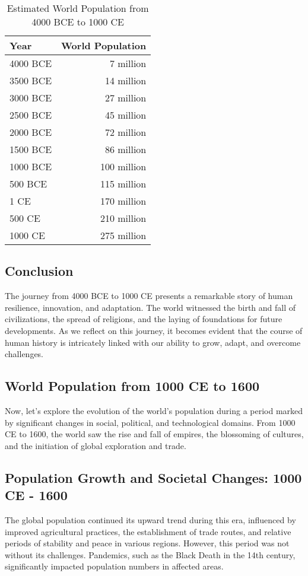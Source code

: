 \documentclass{book}
\begin{document}
\begin{table}[h!]
\centering
\begin{tabular}{|l|r|}
\hline
Year & World Population \\
\hline
4000 BCE & 7 million \\
3500 BCE & 14 million \\
3000 BCE & 27 million \\
2500 BCE & 45 million \\
2000 BCE & 72 million \\
1500 BCE & 86 million \\
1000 BCE & 100 million \\
500 BCE & 115 million \\
1 CE & 170 million \\
500 CE & 210 million \\
1000 CE & 275 million \\
\hline
\end{tabular}
\caption{Estimated World Population from 4000 BCE to 1000 CE}
\label{tab:world_population}
\end{table}

\subsection*{Conclusion}
The journey from 4000 BCE to 1000 CE presents a remarkable story of human resilience, innovation, and adaptation. The world witnessed the birth and fall of civilizations, the spread of religions, and the laying of foundations for future developments. As we reflect on this journey, it becomes evident that the course of human history is intricately linked with our ability to grow, adapt, and overcome challenges.

\subsection*{World Population from 1000 CE to 1600}
Now, let's explore the evolution of the world's population during a period marked by significant changes in social, political, and technological domains. From 1000 CE to 1600, the world saw the rise and fall of empires, the blossoming of cultures, and the initiation of global exploration and trade.

\subsection*{Population Growth and Societal Changes: 1000 CE - 1600}
The global population continued its upward trend during this era, influenced by improved agricultural practices, the establishment of trade routes, and relative periods of stability and peace in various regions. However, this period was not without its challenges. Pandemics, such as the Black Death in the 14th century, significantly impacted population numbers in affected areas.
\end{document}
